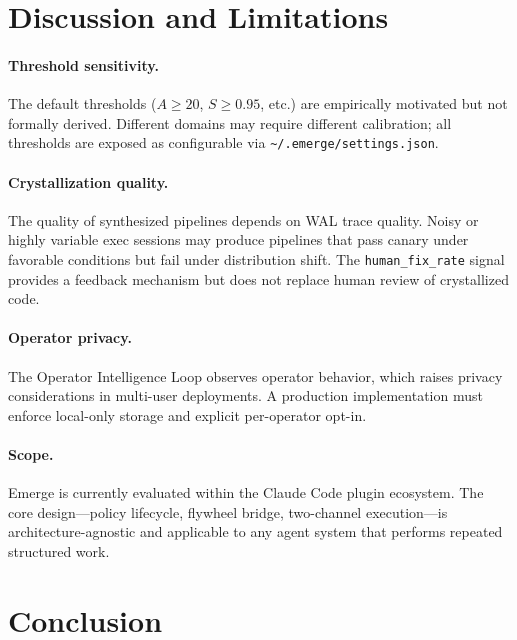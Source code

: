 \documentclass[11pt,a4paper]{article}
\begin{document}
\section{Discussion and Limitations}

\paragraph{Threshold sensitivity.}
The default thresholds ($A \geq 20$, $S \geq 0.95$, etc.) are empirically motivated but not formally derived.
Different domains may require different calibration; all thresholds are exposed as configurable via
\texttt{\textasciitilde/.emerge/settings.json}.

\paragraph{Crystallization quality.}
The quality of synthesized pipelines depends on WAL trace quality.
Noisy or highly variable exec sessions may produce pipelines that pass canary under favorable conditions
but fail under distribution shift.
The \texttt{human\_fix\_rate} signal provides a feedback mechanism but does not replace human review of
crystallized code.

\paragraph{Operator privacy.}
The Operator Intelligence Loop observes operator behavior, which raises privacy considerations in multi-user
deployments.
A production implementation must enforce local-only storage and explicit per-operator opt-in.

\paragraph{Scope.}
Emerge is currently evaluated within the Claude Code plugin ecosystem.
The core design---policy lifecycle, flywheel bridge, two-channel execution---is architecture-agnostic and
applicable to any agent system that performs repeated structured work.

\section{Conclusion}
\end{document}
